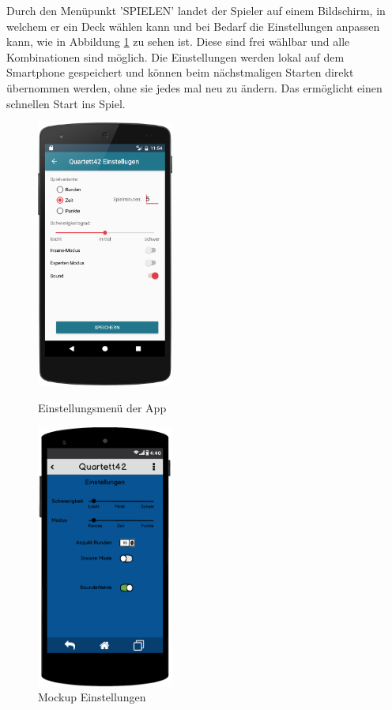 Durch den Menüpunkt 'SPIELEN' landet der Spieler auf einem Bildschirm, in welchem er ein Deck wählen kann und bei Bedarf die Einstellungen anpassen kann, wie in Abbildung \ref{figure:implementierungeinstellungen} zu sehen ist. Diese sind frei wählbar und alle Kombinationen sind möglich. Die Einstellungen werden lokal auf dem Smartphone gespeichert und können beim nächstmaligen Starten direkt übernommen werden, ohne sie jedes mal neu zu ändern. Das ermöglicht einen schnellen Start ins Spiel.\\

\begin{figure}[h]
    \centering
    \begin{minipage}{0.49\textwidth}
        \centering
        \includegraphics[width=0.4\textwidth]{img/screenshots/device_settings.png}
		\caption{Einstellungsmenü der App}
		\label{figure:implementierungeinstellungen}
    \end{minipage}
    \begin{minipage}{0.49\textwidth}
        \centering
        \includegraphics[width=0.4\textwidth]{img/mockups/einstellungen.png}
        \caption{Mockup Einstellungen}
    \end{minipage}
\end{figure}

